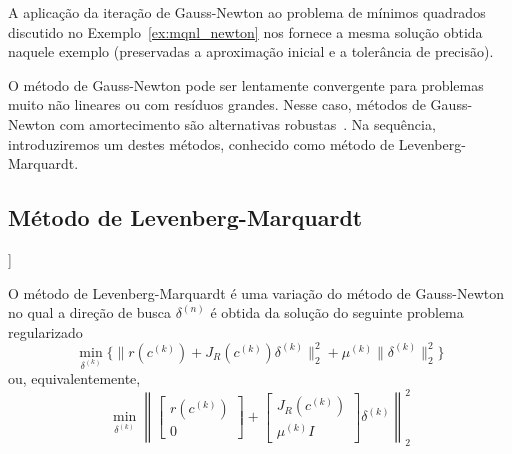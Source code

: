 \begin{ex}
  A aplicação da iteração de Gauss-Newton ao problema de mínimos quadrados discutido no Exemplo~\ref{ex:mqnl_newton} nos fornece a mesma solução obtida naquele exemplo (preservadas a aproximação inicial e a tolerância de precisão).






\end{ex}

O método de Gauss-Newton pode ser lentamente convergente para problemas muito não lineares ou com resíduos grandes. Nesse caso, métodos de Gauss-Newton com amortecimento são alternativas robustas~\cite{Bjorck1996a,Nocedal2006a}. Na sequência, introduziremos um destes métodos, conhecido como método de Levenberg-Marquardt.

\subsection{Método de Levenberg-Marquardt}

\begin{flushleft}
  [[tag:revisar]]
\end{flushleft}

O método de Levenberg-Marquardt é uma variação do método de Gauss-Newton no qual a direção de busca $\delta^{(n)}$ é obtida da solução do seguinte problema regularizado
\begin{equation} \label{eq:mq_gn0}
  \min_{\delta^{(k)}} \{\|r(c^{(k)}) + J_R(c^{(k)})\delta^{(k)}\|_2^2 + \mu^{(k)}\|\delta^{(k)}\|_2^2\}
\end{equation}
ou, equivalentemente,
\begin{equation} \label{eq:mq_gn0}
  \min_{\delta^{(k)}} \left\|
    \begin{bmatrix}
      r(c^{(k)})\\
      0
    \end{bmatrix} +
    \begin{bmatrix}
      J_R(c^{(k)})\\
      \mu^{(k)}I
    \end{bmatrix}
    \delta^{(k)}\right\|_2^2
\end{equation}

